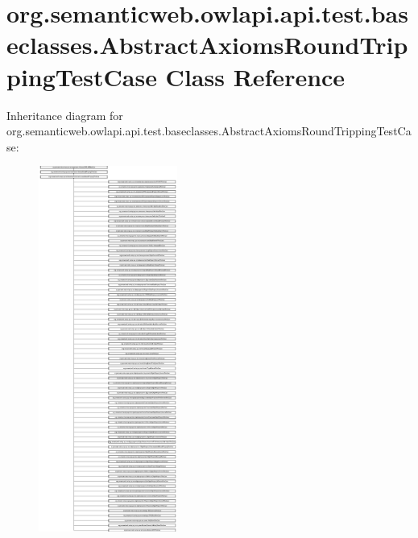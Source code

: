 \hypertarget{classorg_1_1semanticweb_1_1owlapi_1_1api_1_1test_1_1baseclasses_1_1_abstract_axioms_round_tripping_test_case}{\section{org.\-semanticweb.\-owlapi.\-api.\-test.\-baseclasses.\-Abstract\-Axioms\-Round\-Tripping\-Test\-Case Class Reference}
\label{classorg_1_1semanticweb_1_1owlapi_1_1api_1_1test_1_1baseclasses_1_1_abstract_axioms_round_tripping_test_case}
}
Inheritance diagram for org.\-semanticweb.\-owlapi.\-api.\-test.\-baseclasses.\-Abstract\-Axioms\-Round\-Tripping\-Test\-Case\-:\begin{figure}[H]
\begin{center}
\leavevmode
\includegraphics[height=12.000000cm]{classorg_1_1semanticweb_1_1owlapi_1_1api_1_1test_1_1baseclasses_1_1_abstract_axioms_round_tripping_test_case}
\end{center}
\end{figure}
